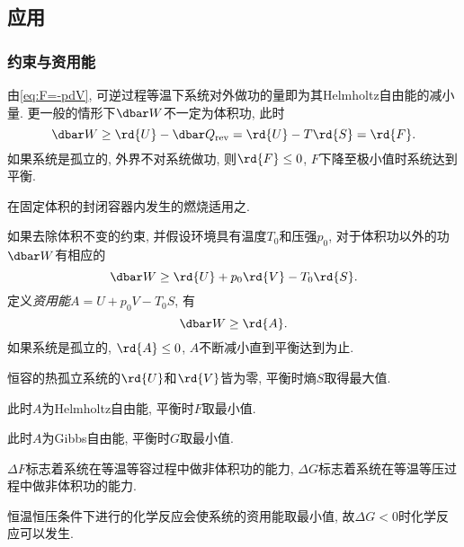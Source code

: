 \documentclass[../Thermal.tex]{subfiles}
\begin{document}
\subsection{应用}
\subsubsection{约束与资用能}
由\eqref{eq:F=-pdV}, 可逆过程等温下系统对外做功的量即为其Helmholtz自由能的减小量. 更一般的情形下$\dbar W$不一定为体积功, 此时
\[ \dbar W \ge \rd{U} - \dbar Q_{\text{rev}} = \rd{U} - T\rd{S} = \rd{F}. \]
如果系统是孤立的, 外界不对系统做功, 则$\rd{F}\le 0$, $F$下降至极小值时系统达到平衡.
\begin{ex}
在固定体积的封闭容器内发生的燃烧适用之.
\end{ex}
如果去除体积不变的约束, 并假设环境具有温度$T_0$和压强$p_0$, 对于体积功以外的功$\dbar W$有相应的
\[ \dbar W \ge \rd{U} + p_0\rd{V} - T_0\rd{S}. \]
定义\emph{资用能}$A = U + p_0V - T_0S$, 有
\[ \dbar W \ge \rd{A}. \]
如果系统是孤立的, $\rd{A}\le 0$, $A$不断减小直到平衡达到为止.
\begin{ex}
恒容的热孤立系统的$\rd{U}$和$\rd{V}$皆为零, 平衡时熵$S$取得最大值.
\end{ex}
\begin{ex}[等温等容过程]
此时$A$为Helmholtz自由能, 平衡时$F$取最小值.
\end{ex}
\begin{ex}[等温等压过程]
此时$A$为Gibbs自由能, 平衡时$G$取最小值.
\end{ex}
\begin{finale}
\begin{corollary}
$\Delta F$标志着系统在等温等容过程中做非体积功的能力, $\Delta G$标志着系统在等温等压过程中做非体积功的能力.
\end{corollary}
\end{finale}
\begin{ex}
恒温恒压条件下进行的化学反应会使系统的资用能取最小值, 故$\Delta G < 0$时化学反应可以发生.
\end{ex}
\end{document}
